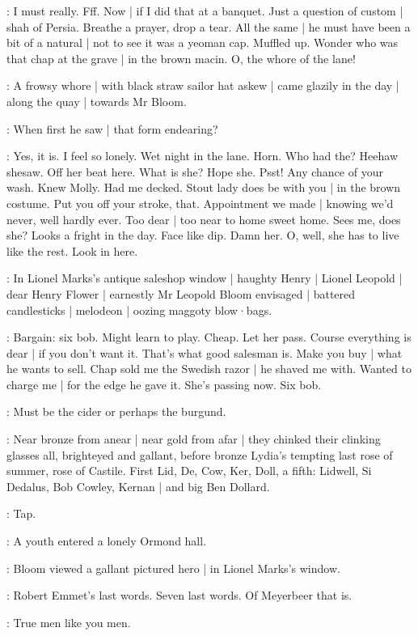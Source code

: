 \BloomIntA:
I must really.
Fff.
Now |
if I did that at a banquet.
Just a question of custom |
shah of Persia.
Breathe a prayer,
drop a tear.
All the same |
he must have been a bit of a natural |
not to see it was a yeoman cap.
Muffled up.
Wonder who was that chap at the grave |
in the brown macin.
O,
the whore of the lane!

:
A frowsy whore |
with black straw sailor hat askew |
came glazily in the day |
along the quay |
towards Mr Bloom.

:
When first he saw |
that form endearing?

\BloomIntA:
Yes,
it is.
I feel so lonely.
Wet night in the lane.
Horn.
Who had the?
Heehaw shesaw.
Off her beat here.
What is she?
Hope she.
Psst!
Any chance of your wash.
Knew Molly.
Had me decked.
Stout lady does be with you |
in the brown costume.
Put you off your stroke,
that.
Appointment we made |
knowing we'd never,
well hardly ever.
Too dear |
too near to home sweet home.
Sees me,
does she?
Looks a fright in the day.
Face like dip.
Damn her.
O,
well,
she has to live like the rest.
Look in here.

:
In Lionel Marks's antique saleshop window |
haughty Henry |
Lionel Leopold |
dear Henry Flower |
earnestly Mr Leopold Bloom envisaged |
battered candlesticks |
melodeon |
oozing maggoty blow·bags.

\BloomIntB:
Bargain:
six bob.
Might learn to play.
Cheap.
Let her pass.
Course everything is dear |
if you don't want it.
That's what good salesman is.
Make you buy |
what he wants to sell.
Chap sold me the Swedish razor |
he shaved me with.
Wanted to charge me |
for the edge he gave it.
She's passing now.
Six bob.

\BloomIntA:
Must be the cider or perhaps the burgund.

:
Near bronze from anear |
near gold from afar |
they chinked their clinking glasses all,
brighteyed and gallant,
before bronze Lydia's tempting
last rose of summer,
rose of Castile.
First Lid,
De,
Cow,
Ker,
Doll,
a fifth:
Lidwell,
Si Dedalus,
Bob Cowley,
Kernan |
and big Ben Dollard.

\stripling:
Tap.

:
A youth entered a lonely Ormond hall.

:
Bloom viewed a gallant pictured hero |
in Lionel Marks's window.

\BloomIntA:
Robert Emmet's last words.
Seven last words.
Of Meyerbeer that is.

\dollard:
True men like you men.

